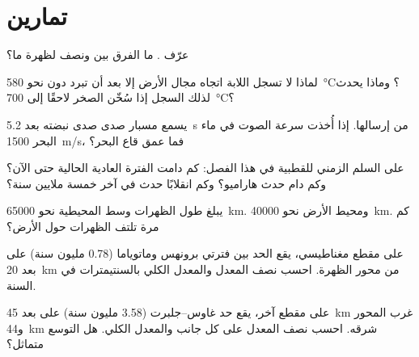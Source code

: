 \section{تمارين}

\begin{exercise}[$\star$]\label{exo:g11:drift-to-spreading:1}
عرّف . ما الفرق بين 
ونصف  لظهرة ما؟
\end{exercise}

\begin{exercise}[$\star$]\label{exo:g11:drift-to-spreading:2}
لماذا لا تسجل اللابة اتجاه مجال الأرض إلا بعد أن تبرد
دون نحو \qty{580}{\celsius}؟ وماذا يحدث لذلك السجل إذا
سُخّن الصخر لاحقًا إلى \qty{700}{\celsius}؟
\end{exercise}

\begin{exercise}[$\star$]\label{exo:g11:drift-to-spreading:3}
يسمع مسبار صدى صدى نبضته بعد \qty{5.2}{s} من إرسالها.
إذا أُخذت سرعة الصوت في ماء البحر \qty{1500}{m/s}، فما عمق
قاع البحر؟
\end{exercise}

\begin{exercise}[$\star$]\label{exo:g11:drift-to-spreading:4}
على السلم الزمني للقطبية في هذا الفصل: كم دامت الفترة العادية
الحالية حتى الآن؟ وكم دام حدث هاراميو؟ وكم انقلابًا
حدث في آخر خمسة ملايين سنة؟
\end{exercise}

\begin{exercise}[$\star$]\label{exo:g11:drift-to-spreading:5}
يبلغ طول الظهرات وسط المحيطية نحو \qty{65000}{km}. ومحيط
الأرض نحو \qty{40000}{km}. كم مرة تلتف الظهرات
حول الأرض؟
\end{exercise}

\begin{exercise}[$\star\star$]\label{exo:g11:drift-to-spreading:6}
على مقطع مغناطيسي، يقع الحد بين فترتي برونهس وماتوياما
(\num{0.78} مليون سنة) على بعد \qty{20}{km} من محور الظهرة. احسب
نصف المعدل والمعدل الكلي بالسنتيمترات في السنة.
\end{exercise}

\begin{exercise}[$\star\star$]\label{exo:g11:drift-to-spreading:7}
على مقطع آخر، يقع حد غاوس--جلبرت (\num{3.58} مليون سنة) على بعد
\qty{45}{km} غرب المحور و\qty{44}{km} شرقه. احسب نصف المعدل على
كل جانب والمعدل الكلي. هل التوسع متماثل؟
\end{exercise}

